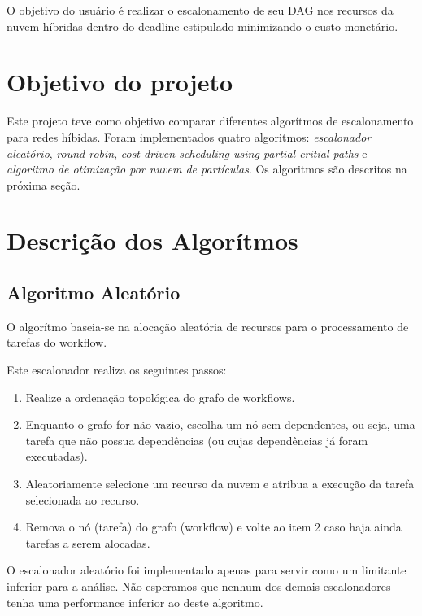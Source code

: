 \documentclass[a4paper,10pt]{article}
\begin{document}
O objetivo do usuário é realizar o escalonamento de seu DAG nos recursos da 
nuvem híbridas dentro do deadline estipulado minimizando o custo monetário.

\section{Objetivo do projeto}

Este projeto teve como objetivo comparar diferentes algorítmos de escalonamento 
para redes híbidas. Foram implementados quatro algoritmos: \emph{escalonador aleatório}, \emph{round robin},
\emph{cost-driven scheduling using partial critial paths} e \emph{algoritmo de otimização por nuvem de partículas}.
Os algoritmos são descritos na próxima seção.

\section{Descrição dos Algorítmos}
\label{algoritmos}

\subsection{Algoritmo Aleatório}

O algorítmo baseia-se na alocação aleatória de recursos para o processamento de tarefas do workflow.

Este escalonador realiza os seguintes passos:

\begin{enumerate}

    \item Realize a ordenação topológica do grafo de workflows.

    \item Enquanto o grafo for não vazio, escolha um nó sem dependentes, ou seja, uma tarefa que não possua dependências 
(ou cujas dependências já foram executadas).

    \item Aleatoriamente selecione um recurso da nuvem e atribua a execução da tarefa selecionada ao recurso.

    \item Remova o nó (tarefa) do grafo (workflow) e volte ao item 2 caso haja ainda tarefas a serem alocadas.

\end{enumerate}

O escalonador aleatório foi implementado apenas para servir como um limitante inferior para a análise.
Não esperamos que nenhum dos demais escalonadores tenha uma performance inferior ao deste algoritmo.
\end{document}
